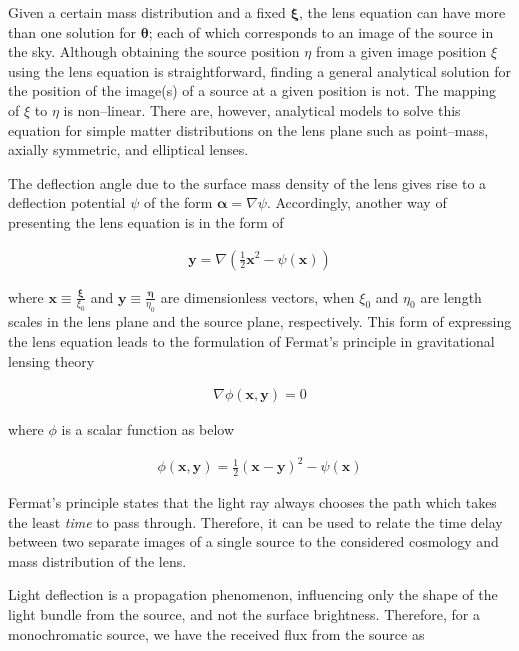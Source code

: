 \documentclass[a4wide,12pt]{book}
\begin{document}
Given a certain mass distribution and a fixed $\boldsymbol \xi$, the lens equation can have more than one solution for $\boldsymbol \theta$; each of which corresponds to an image of the source in the sky.  Although obtaining the source position $\eta$ from a given image position $\xi$ using the lens equation is straightforward, finding a general analytical solution for the position of the image(s) of a source at a given position is not. The mapping of $\xi$ to $\eta$ is non--linear. There are, however, analytical models to solve this equation for simple matter distributions on the lens plane such as point--mass, axially symmetric, and elliptical lenses.

The deflection angle due to the surface mass density of the lens gives rise to a deflection potential $\psi$ of the form $\boldsymbol \alpha = \nabla \psi$. Accordingly, another way of presenting the lens equation is in the form of 

\begin{eqnarray}
\label{eq:potential_dimensionless_lensing}
\textbf{y} = \nabla \left(\frac{1}{2}\textbf{x}^2 - \psi(\textbf{x}) \right)
\end{eqnarray}

where $\textbf{x} \equiv \frac{\boldsymbol \xi}{\xi_0}$ and $\textbf{y} \equiv \frac{\boldsymbol \eta}{\eta_0}$ are dimensionless vectors, when $\xi_0$ and $\eta_0$ are length scales in the lens plane and the source plane, respectively. This form of expressing the lens equation leads to the formulation of Fermat's principle in gravitational lensing theory

\begin{eqnarray}
\nabla \phi(\textbf{x}, \textbf{y}) = 0
\end{eqnarray}

where $\phi$ is a scalar function as below

\begin{eqnarray}
\phi(\textbf{x}, \textbf{y}) = \frac{1}{2} (\textbf{x} - \textbf{y})^2 - \psi(\textbf{x})
\end{eqnarray}

Fermat's principle states that the light ray always chooses the path which takes the least \emph{time} to pass through. Therefore, it can be used to relate the time delay between two separate images of a single source to the considered cosmology and mass distribution of the lens.

Light deflection is a propagation phenomenon, influencing only the shape of the light bundle from the source, and not the surface brightness. Therefore, for a monochromatic source, we have the received flux from the source as 
\end{document}

